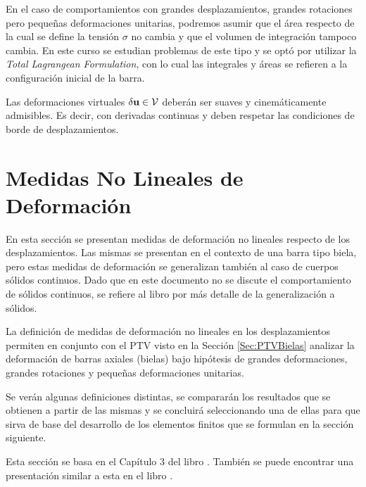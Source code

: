 En el caso de comportamientos con grandes desplazamientos, grandes rotaciones pero pequeñas deformaciones unitarias, podremos asumir que el área respecto de la cual se define la tensión $\sigma$ no cambia y que el volumen de integración tampoco cambia. En este curso se estudian problemas de este tipo y se optó por utilizar la \textit{Total Lagrangean Formulation}, con lo cual las integrales y áreas se refieren a la configuración inicial de la barra.


Las deformaciones virtuales $\delta {\bf u} \in {\mathcal V}$ deberán ser suaves y cinemáticamente admisibles. Es decir, con derivadas continuas y deben respetar las condiciones de borde de desplazamientos.




\section{Medidas No Lineales de Deformación} \label{sec:nlsm}

En esta sección se presentan medidas de deformación no lineales respecto de los desplazamientos. Las mismas se presentan en el contexto de una barra tipo biela, pero estas medidas de deformación se generalizan también al caso de cuerpos sólidos continuos. %
%
Dado que en este documento no se discute el comportamiento de sólidos continuos, se refiere al libro \citep{crisfield1996non} por más detalle de la generalización a sólidos.

La definición de medidas de deformación no lineales en los desplazamientos permiten en conjunto con el PTV visto en la Sección \ref{Sec:PTVBielas} analizar la deformación de barras axiales (bielas) bajo hipótesis de grandes deformaciones, grandes rotaciones y pequeñas deformaciones unitarias.

Se verán algunas definiciones distintas, se compararán los resultados que se obtienen a partir de las mismas y se concluirá seleccionando una de ellas para que sirva de base del desarrollo de los elementos finitos que se formulan en la sección siguiente.

Esta sección se basa en el Capítulo 3 del libro \citep{crisfield1996non}. También se puede encontrar una presentación similar a esta en el libro \citep{bonet2008nonlinear}.

